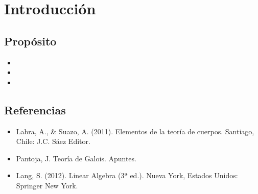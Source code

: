
\section{Introducción}
\vspace{2mm}

\subsection{Propósito}

\begin{itemize}
\item 
\item 
\item 
\end{itemize}

\subsection{Referencias}
\begin{itemize}
    \item Labra, A., & Suazo, A. (2011). Elementos de la teoría de cuerpos. Santiago, Chile: J.C. Sáez Editor.
    \item Pantoja, J. Teoría de Galois. Apuntes. 
    \item Lang, S. (2012). Linear Algebra (3ª ed.). Nueva York, Estados Unidos: Springer New York.
\end{itemize}
